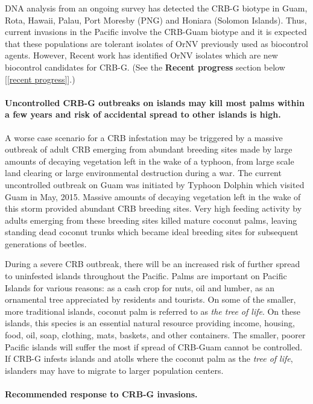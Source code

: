 \documentclass[12pt,letterpaper,english,bibliography=totocnumbered, abstract=on]{scrartcl}
\begin{document}
DNA analysis from an ongoing survey has detected the CRB-G biotype
in Guam, Rota, Hawaii, Palau, Port Moresby (PNG) and Honiara (Solomon Islands).
Thus, current invasions in the Pacific involve the CRB-Guam biotype
and it is expected that these populations are tolerant
isolates of OrNV previously used as biocontrol agents. However, Recent work has identified OrNV isolates which are new biocontrol candidates for CRB-G. (See the \textbf{Recent progress} section below [\ref{recent progress}].)

\paragraph*{Uncontrolled CRB-G outbreaks on islands may kill most palms within a few
years and risk of accidental spread to other islands is high.}

A worse case scenario for a CRB infestation may be triggered by a massive outbreak of adult
CRB emerging from abundant breeding sites made by large amounts of
decaying vegetation left in the wake of a typhoon, from large scale land clearing or large environmental destruction during a war.  The current uncontrolled outbreak on Guam was initiated
by Typhoon Dolphin which visited Guam in May, 2015. Massive amounts of decaying vegetation left in the wake of this storm provided abundant CRB breeding sites. Very high feeding activity by adults emerging 
from these breeding sites killed mature coconut palms, leaving standing dead coconut trunks
which became ideal breeding sites for subsequent generations of beetles. 

During a severe CRB outbreak, there will be an increased risk of further
spread to uninfested islands throughout the Pacific. Palms are important
on Pacific Islands for various reasons: as a cash crop for nuts, oil
and lumber, as an ornamental tree appreciated by residents and tourists.
On some of the smaller, more traditional islands, coconut palm
is referred to as \emph{the tree of life}. On these islands, this species is an
essential natural resource providing income, housing, food, oil, soap,
clothing, mats, baskets, and other containers. The smaller, poorer
Pacific islands will suffer the most if spread of CRB-Guam cannot
be controlled. If CRB-G infests islands and atolls where the coconut
palm as the \emph{tree of life}, islanders may have to migrate to
larger population centers.

\paragraph*{Recommended response to CRB-G invasions.}
\end{document}
